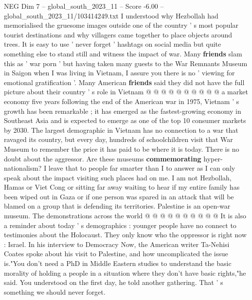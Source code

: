 \begin{textsample}{NEG Dim 7 – global\_south\_2023\_11 – Score -6.00 – global\_south\_2023\_11/103414249.txt}
I understood why Hezbollah had memorialised the gruesome images outside one of the country ' s most popular tourist destinations and why villagers came together to place objects around trees.
It is easy to use ' never forget ' hashtags on social media but quite something else to stand still and witness the impact of war.
Many \textbf{friends} slam this as ' war porn ' but having taken many guests to the War Remnants Museum in Saigon when I was living in Vietnam, I assure you there is no ' viewing for emotional gratification '.
Many American \textbf{friends} said they did not have the full picture about their country ' s role in Vietnam @ @ @ @ @ @ @ @ @ @ a market economy five years following the end of the American war in 1975, Vietnam ' s growth has been remarkable ; it has emerged as the fastest-growing economy in Southeast Asia and is expected to emerge as one of the top 10 consumer markets by 2030.
The largest demographic in Vietnam has no connection to a war that ravaged its country, but every day, hundreds of schoolchildren visit that War Museum to remember the price it has paid to be where it is today.
There is no doubt about the aggressor.
Are these museums \textbf{commemorating} hyper-nationalism?
I leave that to people far smarter than I to answer as I can only speak about the impact visiting such places had on me.
I am not Hezbollah, Hamas or Viet Cong or sitting far away waiting to hear if my entire family has been wiped out in Gaza or if one person was spared in an attack that will be blamed on a group that is defending its territories.
Palestine is an open-war museum.
The demonstrations across the world @ @ @ @ @ @ @ @ @ @ It is also a reminder about today ' s demographics : younger people have no connect to testimonies about the Holocaust.
They only know who the oppressor is right now : Israel.
In his interview to Democracy Now, the American writer Ta-Nehisi Coates spoke about his visit to Palestine, and how uncomplicated the issue is."You don't need a PhD in Middle Eastern studies to understand the basic morality of holding a people in a situation where they don't have basic rights,"he said.
You understood on the first day, he told another gathering.
That ' s something we should never forget.

\end{textsample}
